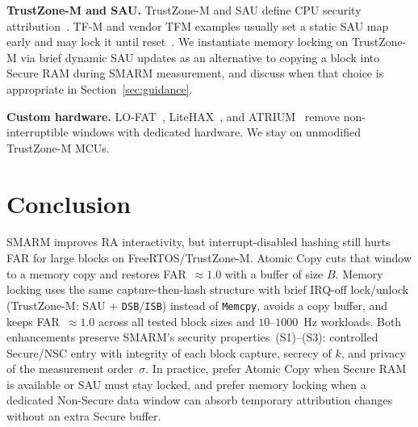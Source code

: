 \documentclass[conference]{IEEEtran}
\begin{document}
\textbf{TrustZone-M and SAU.}
TrustZone-M and SAU define CPU security
attribution~\cite{trustzone2025,armv8m-arm,an5347,cmsis-tz}. TF-M and
vendor TFM examples usually set a static SAU map early and may lock it
until reset~\cite{tfm2024,tfm-isolation,um2851}. We instantiate memory
locking on TrustZone-M via brief dynamic SAU updates as an alternative
to copying a block into Secure RAM during SMARM measurement, and discuss
when that choice is appropriate in Section~\ref{sec:guidance}.

\textbf{Custom hardware.}
LO-FAT~\cite{lo-fat}, LiteHAX~\cite{litehax}, and ATRIUM~\cite{atrium}
remove non-interruptible windows with dedicated hardware. We stay on
unmodified TrustZone-M MCUs.

\section{Conclusion}
\label{sec:conclusion}

SMARM improves RA interactivity, but interrupt-disabled hashing still
hurts FAR for large blocks on FreeRTOS/TrustZone-M. Atomic Copy cuts
that window to a memory copy and restores FAR~$\approx 1.0$ with a
buffer of size $B$. Memory locking uses the same capture-then-hash
structure with brief IRQ-off lock/unlock (TrustZone-M: SAU +
\texttt{DSB}/\texttt{ISB}) instead of \texttt{Memcpy}, avoids a copy
buffer, and keeps FAR~$\approx 1.0$ across all tested block sizes and
$10$--$1000$~Hz workloads. Both enhancements preserve SMARM's
security properties~(S1)--(S3): controlled Secure/NSC entry with
integrity of each block capture, secrecy of $k$, and privacy of the
measurement order~$\sigma$. In practice, prefer Atomic Copy when
Secure RAM is available or SAU must stay locked, and prefer memory
locking when a dedicated Non-Secure data window can absorb temporary
attribution changes without an extra Secure buffer.



\end{document}
